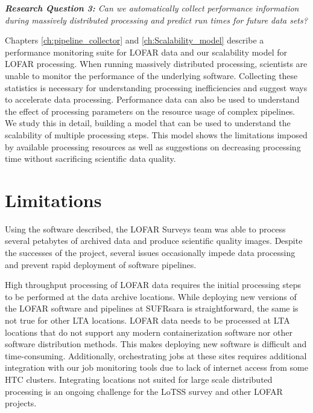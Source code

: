 \begin{addmargin}[4em]{8em}%
    \emph{\textbf{Research Question 3:} Can we automatically collect performance information during massively distributed processing and predict run times for future data sets?}
\end{addmargin}

Chapters \ref{ch:pipeline_collector} and \ref{ch:Scalability_model} describe a performance monitoring suite for LOFAR data and our scalability model for LOFAR processing. When running massively distributed processing, scientists are unable to monitor the performance of the underlying software. Collecting these statistics is necessary for understanding processing inefficiencies and suggest ways to accelerate data processing. Performance data can also be used to understand the effect of processing parameters on the resource usage of complex pipelines. We study this in detail, building a model that can be used to understand the scalability of multiple processing steps. This model shows the limitations imposed by available processing resources as well as suggestions on decreasing processing time without sacrificing scientific data quality. 

\section{Limitations}

Using the software described, the LOFAR Surveys team was able to process several petabytes of archived data and produce scientific quality images. Despite the successes of the project, several issues occasionally impede data processing and prevent rapid deployment of software pipelines.

High throughput processing of LOFAR data requires the initial processing steps to be performed at the data archive locations. While deploying new versions of the LOFAR software and pipelines at SUFRsara is straightforward, the same is not true for other LTA locations. LOFAR data needs to be processed at LTA locations that do not support any modern containerization software nor other software distribution methods. This makes deploying new software is difficult and time-consuming. Additionally, orchestrating jobs at these sites requires additional integration with our job monitoring tools due to lack of internet access from some HTC clusters. Integrating locations not suited for large scale distributed processing is an ongoing challenge for the LoTSS survey and other LOFAR projects.


